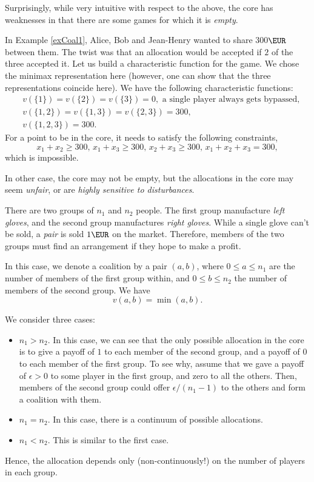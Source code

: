 Surprisingly, while very intuitive with respect to the above, the core has weaknesses in that there are some games for which it is \emph{empty}.
\begin{example}
In Example \ref{exCoal1}, Alice, Bob and Jean-Henry wanted to share 300$\EUR$ between them. The twist was that an allocation would be accepted if $2$ of the three accepted it.
Let us build a characteristic function for the game. We chose the minimax representation here (however, one can show that the three representations coincide here).
We have the following characteristic functions:
$$
\begin{aligned}
&v(\{1\}) = v(\{2\}) = v(\{3\}) = 0, \text{ a single player always gets bypassed,}\\
&v(\{1,2\}) = v(\{1,3\}) = v(\{2,3\}) = 300, \\
&v(\{1,2,3\}) = 300.
\end{aligned}
$$
For a point to be in the core, it needs to satisfy the following constraints,
$$x_1 + x_2 \geq 300, \, x_1 + x_3 \geq 300, \, x_2 + x_3 \geq 300, \, x_1 + x_2 + x_3 = 300, $$
which is impossible.
\end{example}

In other case, the core may not be empty, but the allocations in the core may seem \emph{unfair}, or are \emph{highly sensitive to disturbances}.
\begin{example}
There are two groups of $n_1$ and $n_2$ people. The first group manufacture \emph{left gloves}, and the second group manufactures \emph{right gloves}. While a single glove can't be sold, a \emph{pair} is sold $1\EUR$ on the market. Therefore, members of the two groups must find an arrangement if they hope to make a profit.

In this case, we denote a coalition by a pair $(a,b)$, where $0 \leq  a \leq n_1$ are the number of members of the first group within, and $0 \leq b \leq n_2$ the number of members of the second group.
We have $$v(a,b) = \min(a,b). $$

We consider three cases:
\begin{itemize}
\item $n_1 > n_2$. In this case, we can see that the only possible allocation in the core is to give a payoff of $1$ to each member of the second group, and a payoff of $0$ to each member of the first group.
To see why, assume that we gave a payoff of $\epsilon > 0$ to some player in the first group, and zero to all the others. Then, members of the second group could offer $\epsilon/(n_1 - 1)$ to the others and form a coalition with them.
\item $n_1 = n_2$. In this case, there is a continuum of possible allocations.
\item $n_1 < n_2$. This is similar to the first case.
\end{itemize}
Hence, the allocation depends only (non-continuously!) on the number of players in each group.
\end{example}

